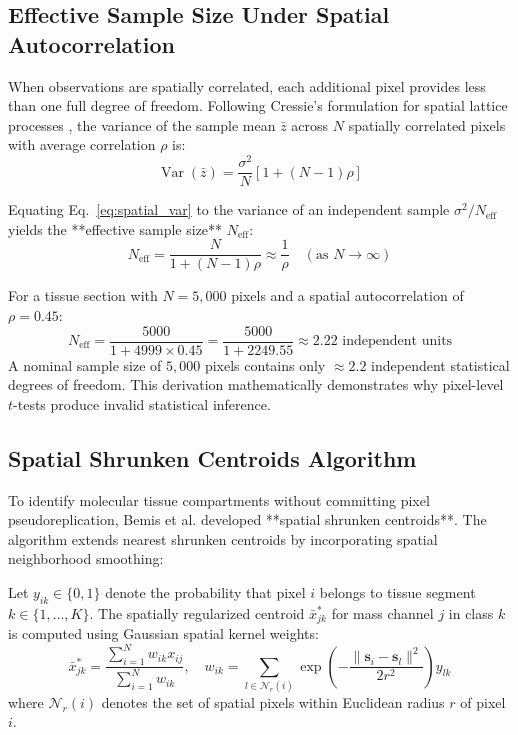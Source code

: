 \documentclass[11pt,twoside,openright]{book}
\begin{document}
\subsection{Effective Sample Size Under Spatial Autocorrelation}

When observations are spatially correlated, each additional pixel provides less than one full degree of freedom. Following Cressie's formulation for spatial lattice processes \cite{cressie1993statistics}, the variance of the sample mean $\bar{z}$ across $N$ spatially correlated pixels with average correlation $\rho$ is:
\begin{equation}
\operatorname{Var}(\bar{z}) = \frac{\sigma^2}{N} \left[ 1 + (N - 1) \rho \right]
\label{eq:spatial_var}
\end{equation}

Equating Eq.~\eqref{eq:spatial_var} to the variance of an independent sample $\sigma^2 / N_{\text{eff}}$ yields the **effective sample size** $N_{\text{eff}}$:
\begin{equation}
N_{\text{eff}} = \frac{N}{1 + (N - 1) \rho} \approx \frac{1}{\rho} \quad (\text{as } N \to \infty)
\label{eq:effective_n}
\end{equation}

For a tissue section with $N = 5{,}000$ pixels and a spatial autocorrelation of $\rho = 0.45$:
\begin{equation}
N_{\text{eff}} = \frac{5000}{1 + 4999 \times 0.45} = \frac{5000}{1 + 2249.55} \approx 2.22 \text{ independent units}
\end{equation}
A nominal sample size of $5{,}000$ pixels contains only $\approx 2.2$ independent statistical degrees of freedom. This derivation mathematically demonstrates why pixel-level $t$-tests produce invalid statistical inference.

\subsection{Spatial Shrunken Centroids Algorithm}

To identify molecular tissue compartments without committing pixel pseudoreplication, Bemis et al. \cite{bemis2015cardinal} developed **spatial shrunken centroids**. The algorithm extends nearest shrunken centroids \cite{tibshirani2002diagnosis} by incorporating spatial neighborhood smoothing:

Let $y_{ik} \in \{0, 1\}$ denote the probability that pixel $i$ belongs to tissue segment $k \in \{1, \dots, K\}$. The spatially regularized centroid $\bar{x}_{jk}^*$ for mass channel $j$ in class $k$ is computed using Gaussian spatial kernel weights:
\begin{equation}
\bar{x}_{jk}^* = \frac{\sum_{i=1}^{N} w_{ik} x_{ij}}{\sum_{i=1}^{N} w_{ik}}, \quad w_{ik} = \sum_{l \in \mathcal{N}_r(i)} \exp\left( -\frac{\|\mathbf{s}_i - \mathbf{s}_l\|^2}{2 r^2} \right) y_{lk}
\label{eq:spatial_centroid}
\end{equation}
where $\mathcal{N}_r(i)$ denotes the set of spatial pixels within Euclidean radius $r$ of pixel $i$.
\end{document}

